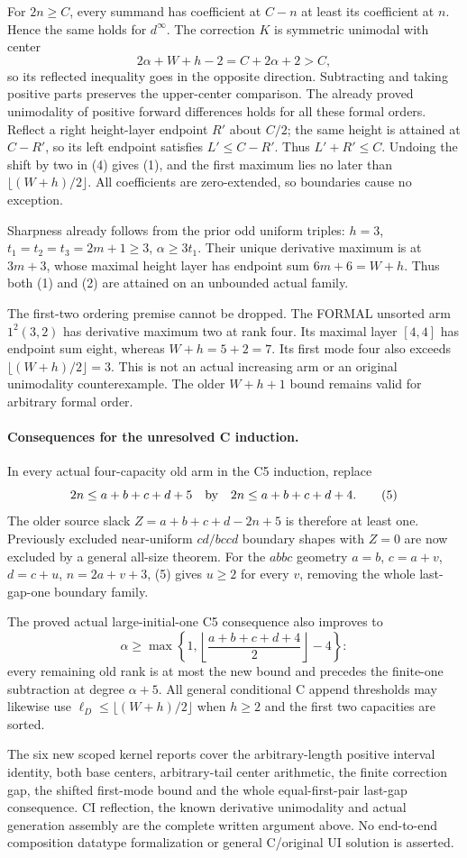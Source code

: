 For $2n\ge C$, every summand has coefficient at $C-n$ at least
its coefficient at $n$. Hence the same holds for $d^\infty$.
The correction $K$ is symmetric unimodal with center
\[
                2\alpha+W+h-2=C+2\alpha+2>C,
\]
so its reflected inequality goes in the opposite direction.
Subtracting and taking positive parts preserves the upper-center
comparison. The already proved unimodality of positive forward
differences holds for all these formal orders. Reflect a right
height-layer endpoint $R'$ about $C/2$; the same height is
attained at $C-R'$, so its left endpoint satisfies
$L'\le C-R'$. Thus $L'+R'\le C$.
Undoing the shift by two in (4) gives (1), and the first
maximum lies no later than $\lfloor(W+h)/2\rfloor$.
All coefficients are zero-extended, so boundaries cause no exception.

Sharpness already follows from the prior odd uniform triples:
$h=3$, $t_1=t_2=t_3=2m+1\ge3$, $\alpha\ge3t_1$.
Their unique derivative maximum is at $3m+3$, whose maximal
height layer has endpoint sum $6m+6=W+h$.
Thus both (1) and (2) are attained on an unbounded actual family.

The first-two ordering premise cannot be dropped. The FORMAL
unsorted arm $1^2(3,2)$ has derivative maximum two at rank four.
Its maximal layer $[4,4]$ has endpoint sum eight, whereas
$W+h=5+2=7$. Its first mode four also exceeds
$\lfloor(W+h)/2\rfloor=3$. This is not an actual increasing arm
or an original unimodality counterexample. The older $W+h+1$
bound remains valid for arbitrary formal order.

\paragraph{Consequences for the unresolved C induction.}
In every actual four-capacity old arm in the C5 induction, replace
\[
                   2n\le a+b+c+d+5
       \quad\hbox{by}\quad 2n\le a+b+c+d+4.              \tag{5}
\]
The older source slack $Z=a+b+c+d-2n+5$ is therefore at least
one. Previously excluded near-uniform $cd/bccd$ boundary shapes
with $Z=0$ are now excluded by a general all-size theorem.
For the $abbc$ geometry $a=b$, $c=a+v$, $d=c+u$,
$n=2a+v+3$, (5) gives $u\ge2$ for every $v$, removing the
whole last-gap-one boundary family.

The proved actual large-initial-one C5 consequence also improves to
\[
 \alpha\ge\max\left\{1,
             \left\lfloor\frac{a+b+c+d+4}{2}\right\rfloor-4\right\}:
\]
every remaining old rank is at most the new bound and precedes
the finite-one subtraction at degree $\alpha+5$.
All general conditional C append thresholds may likewise use
$\ell_D\le\lfloor(W+h)/2\rfloor$ when $h\ge2$ and the first
two capacities are sorted.

The six new scoped kernel reports cover the arbitrary-length
positive interval identity, both base centers, arbitrary-tail
center arithmetic, the finite correction gap, the shifted first-mode
bound and the whole equal-first-pair last-gap consequence.
CI reflection, the known derivative unimodality and actual generation
assembly are the complete written argument above. No end-to-end
composition datatype formalization or general C/original UI solution
is asserted.
